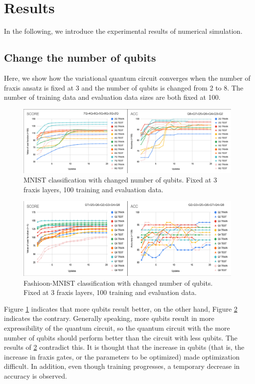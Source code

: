 \section{Results}
In the following, we introduce the experimental results  of numerical simulation. 
\subsection{Change the number of qubits}
Here, we show how the variational quantum circuit converges when the number of fraxis ansatz is fixed at 3 and the number of qubits is changed from 2 to 8. The number of training data and evaluation data sizes are both fixed at 100.

\begin{figure}[H]
    \centering
    \includegraphics[keepaspectratio, scale=0.43]{experiment/figure/MNIST_qubit_change.png}
    \caption{MNIST classification with changed number of qubits. Fixed at 3 fraxis layers, 100 training and evaluation data.}
    \label{fig:MNIST_qubit_change}
\end{figure}
\begin{figure}[H]
    \centering
    \includegraphics[keepaspectratio, scale=0.57]{experiment/figure/FMNIST_qubit_change.png}
    \caption{Fashioon-MNIST classification with changed number of qubits. Fixed at 3 fraxis layers, 100 training and evaluation data.}
    \label{fig:FMNIST_qubit_change}
\end{figure}

\par Figure \ref{fig:MNIST_qubit_change} indicates that more qubits result better, on the other hand, Figure \ref{fig:FMNIST_qubit_change} indicates the contrary. Generally speaking, more qubits result in more expressibility of the quantum circuit, so the quantum circuit with the more number of qubits should perform better than the circuit with less qubits. The results of \ref{fig:FMNIST_qubit_change} contradict this. It is thought that the increase in qubits (that is, the increase in fraxis gates, or the parameters to be optimized) made optimization difficult. In addition, even though training progresses, a temporary decrease in accuracy is observed.\\

